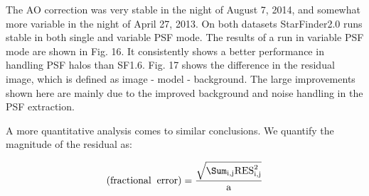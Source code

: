 The AO correction was very stable in the night of August 7, 2014, and somewhat more variable in the night of April 27, 2013. On both datasets StarFinder2.0 runs stable in both single and variable PSF mode. The results of a run in variable PSF mode are shown in Fig. 16. It consistently shows a better performance in handling PSF halos than SF1.6. Fig. 17 shows the difference in the residual image, which is defined as image - model - background. The large improvements shown here are mainly due to the improved background and noise handling in the PSF extraction.

A more quantitative analysis comes to similar conclusions. We quantify the magnitude of the residual as:

\begin{equation}
\rm(fractional \; \; error) = \frac{\sqrt{\Sum_{i,j}{\rm{RES}^2_{i,j}}}}{a}
\end{equation}
  
  
  
  